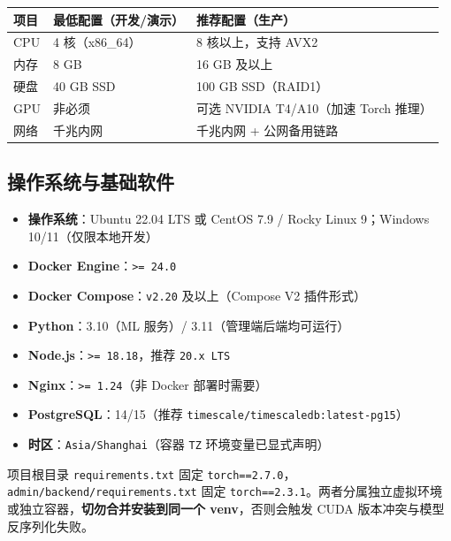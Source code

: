 \documentclass[UTF8,a4paper,11pt]{ctexart}
\begin{document}
\begin{longtable}{L{3.0cm} L{4.5cm} L{4.5cm}}
\toprule
\textbf{项目} & \textbf{最低配置（开发/演示）} & \textbf{推荐配置（生产）} \\
\midrule
\endhead
CPU      & 4 核（x86\_64）        & 8 核以上，支持 AVX2 \\
内存      & 8 GB                  & 16 GB 及以上 \\
硬盘      & 40 GB SSD             & 100 GB SSD（RAID1） \\
GPU      & 非必须                & 可选 NVIDIA T4/A10（加速 Torch 推理） \\
网络      & 千兆内网              & 千兆内网 + 公网备用链路 \\
\bottomrule
\end{longtable}

\subsection{操作系统与基础软件}

\begin{itemize}[leftmargin=1.4em,itemsep=2pt]
  \item \textbf{操作系统}：Ubuntu 22.04 LTS 或 CentOS 7.9 / Rocky Linux 9；Windows 10/11（仅限本地开发）
  \item \textbf{Docker Engine}：\texttt{>= 24.0}
  \item \textbf{Docker Compose}：\texttt{v2.20} 及以上（Compose V2 插件形式）
  \item \textbf{Python}：3.10（ML 服务）/ 3.11（管理端后端均可运行）
  \item \textbf{Node.js}：\texttt{>= 18.18}，推荐 \texttt{20.x LTS}
  \item \textbf{Nginx}：\texttt{>= 1.24}（非 Docker 部署时需要）
  \item \textbf{PostgreSQL}：14/15（推荐 \texttt{timescale/timescaledb:latest-pg15}）
  \item \textbf{时区}：\texttt{Asia/Shanghai}（容器 \texttt{TZ} 环境变量已显式声明）
\end{itemize}

\begin{warnbox}
项目根目录 \texttt{requirements.txt} 固定 \texttt{torch==2.7.0}，\texttt{admin/backend/requirements.txt}
固定 \texttt{torch==2.3.1}。两者分属独立虚拟环境或独立容器，\textbf{切勿合并安装到同一个 venv}，否则会触发
CUDA 版本冲突与模型反序列化失败。
\end{warnbox}
\end{document}
